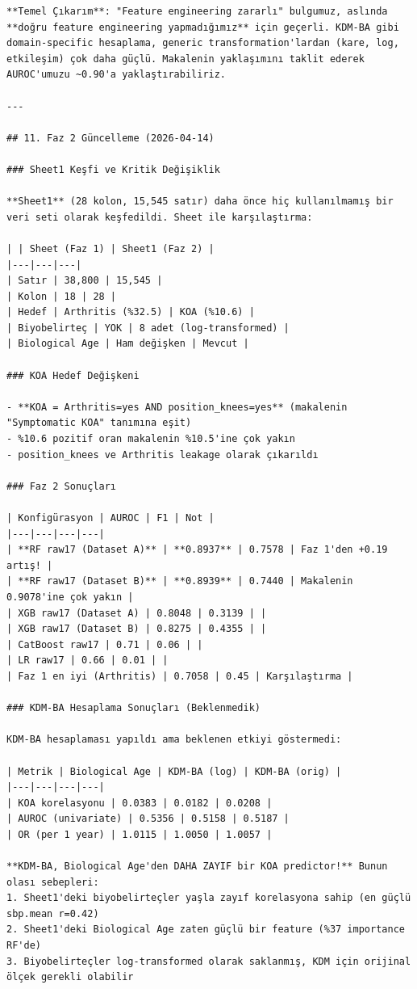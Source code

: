 ﻿\documentclass[11pt,a4paper]{article}
\begin{document}
\begin{verbatim}
**Temel Çıkarım**: "Feature engineering zararlı" bulgumuz, aslında **doğru feature engineering yapmadığımız** için geçerli. KDM-BA gibi domain-specific hesaplama, generic transformation'lardan (kare, log, etkileşim) çok daha güçlü. Makalenin yaklaşımını taklit ederek AUROC'umuzu ~0.90'a yaklaştırabiliriz.

---

## 11. Faz 2 Güncelleme (2026-04-14)

### Sheet1 Keşfi ve Kritik Değişiklik

**Sheet1** (28 kolon, 15,545 satır) daha önce hiç kullanılmamış bir veri seti olarak keşfedildi. Sheet ile karşılaştırma:

| | Sheet (Faz 1) | Sheet1 (Faz 2) |
|---|---|---|
| Satır | 38,800 | 15,545 |
| Kolon | 18 | 28 |
| Hedef | Arthritis (%32.5) | KOA (%10.6) |
| Biyobelirteç | YOK | 8 adet (log-transformed) |
| Biological Age | Ham değişken | Mevcut |

### KOA Hedef Değişkeni

- **KOA = Arthritis=yes AND position_knees=yes** (makalenin "Symptomatic KOA" tanımına eşit)
- %10.6 pozitif oran makalenin %10.5'ine çok yakın
- position_knees ve Arthritis leakage olarak çıkarıldı

### Faz 2 Sonuçları

| Konfigürasyon | AUROC | F1 | Not |
|---|---|---|---|
| **RF raw17 (Dataset A)** | **0.8937** | 0.7578 | Faz 1'den +0.19 artış! |
| **RF raw17 (Dataset B)** | **0.8939** | 0.7440 | Makalenin 0.9078'ine çok yakın |
| XGB raw17 (Dataset A) | 0.8048 | 0.3139 | |
| XGB raw17 (Dataset B) | 0.8275 | 0.4355 | |
| CatBoost raw17 | 0.71 | 0.06 | |
| LR raw17 | 0.66 | 0.01 | |
| Faz 1 en iyi (Arthritis) | 0.7058 | 0.45 | Karşılaştırma |

### KDM-BA Hesaplama Sonuçları (Beklenmedik)

KDM-BA hesaplaması yapıldı ama beklenen etkiyi göstermedi:

| Metrik | Biological Age | KDM-BA (log) | KDM-BA (orig) |
|---|---|---|---|
| KOA korelasyonu | 0.0383 | 0.0182 | 0.0208 |
| AUROC (univariate) | 0.5356 | 0.5158 | 0.5187 |
| OR (per 1 year) | 1.0115 | 1.0050 | 1.0057 |

**KDM-BA, Biological Age'den DAHA ZAYIF bir KOA predictor!** Bunun olası sebepleri:
1. Sheet1'deki biyobelirteçler yaşla zayıf korelasyona sahip (en güçlü sbp.mean r=0.42)
2. Sheet1'deki Biological Age zaten güçlü bir feature (%37 importance RF'de)
3. Biyobelirteçler log-transformed olarak saklanmış, KDM için orijinal ölçek gerekli olabilir


\end{verbatim}
\end{document}

